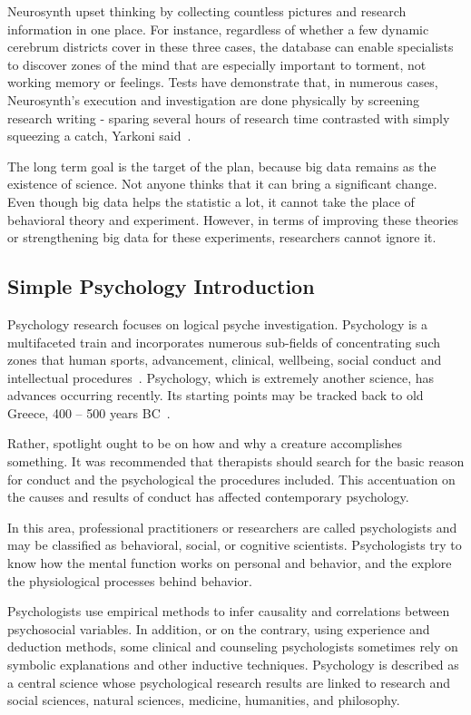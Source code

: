 Neurosynth upset thinking by collecting countless 
pictures and research information in one place. For instance, 
regardless of whether a few 
dynamic cerebrum districts cover in these three cases, the database
 can enable specialists to discover zones of the mind that are 
especially important 
to torment, not working memory or feelings. Tests have demonstrate
 that, in numerous 
cases, Neurosynth's execution and investigation are done physically
 by screening research writing - sparing several hours of research 
time contrasted with simply squeezing a catch, Yarkoni 
said~\cite{hid515-00}.

The long term goal is the target of the plan, because big data 
remains as the existence of science. Not anyone thinks that it can 
bring a significant change. Even though big data helps the 
statistic a lot, 
it cannot take the place of behavioral theory and experiment. 
However, in terms of improving these theories or strengthening 
big data for these experiments, researchers cannot ignore it.

\subsection{Simple Psychology Introduction}

Psychology research focuses on logical psyche investigation. 
Psychology is a multifaceted train and incorporates 
numerous sub-fields of concentrating 
such zones that human sports, advancement, clinical, wellbeing, 
social conduct and intellectual 
procedures~\cite{hid515-01}. Psychology, which is extremely another 
science, has advances occurring recently. Its starting
points may be tracked back to old Greece, 400 – 500 years 
BC~\cite{hid515-01}. 

Rather, spotlight ought to be on how and why a creature 
accomplishes something. It was recommended that therapists should 
search for the basic reason for conduct and the psychological the 
procedures included. This accentuation on the causes and results of
 conduct has affected contemporary psychology.

In this area, professional practitioners or researchers are called 
psychologists and may be classified as behavioral, social, or 
cognitive scientists. Psychologists try to know how the  
mental function works on personal and behavior, and the explore 
the physiological processes behind behavior.

Psychologists use empirical methods to infer causality and 
correlations between psychosocial variables. 
In addition, or on the contrary, using experience and deduction 
methods, some clinical and counseling psychologists sometimes rely
 on symbolic explanations and other inductive techniques. 
Psychology is described as a central science whose psychological 
research results are linked to research and social sciences, 
natural sciences, medicine, humanities, and philosophy.


